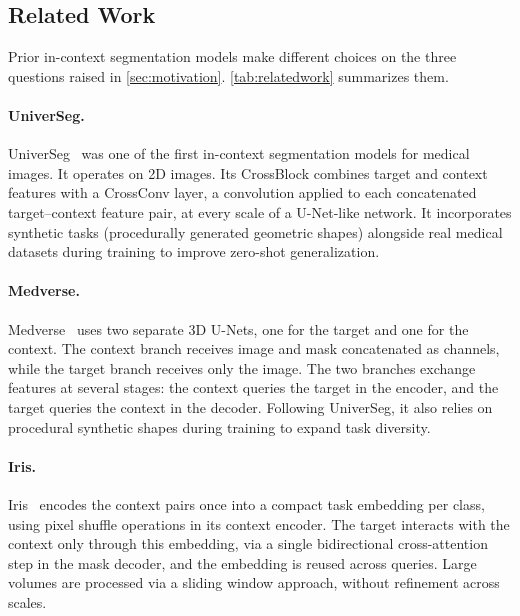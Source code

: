 \documentclass[hidelinks, a4paper, 12pt, ngerman, english]{article}  %
\begin{document}
\subsection{Related Work}\label{sec:fundamentals-relatedwork}

Prior in-context segmentation models make different choices on the three
questions raised in \autoref{sec:motivation}. \autoref{tab:relatedwork}
summarizes them.

\paragraph{UniverSeg.}
UniverSeg~\cite{butoiUniverSegUniversalMedical2023} was one of the first
in-context segmentation models for medical images. It operates on 2D images.
Its CrossBlock combines target and context features with a CrossConv layer, a
convolution applied to each concatenated target--context feature pair, at every
scale of a U-Net-like network. It incorporates 
synthetic tasks (procedurally generated geometric shapes) alongside real 
medical datasets during training to improve zero-shot generalization.



\paragraph{Medverse.}
Medverse~\cite{huMedverseUniversalModel2025a} uses two separate 3D U-Nets, one
for the target and one for the context. The context branch receives image and
mask concatenated as channels, while the target branch receives only the image.
The two branches exchange features at several stages: the context queries the
target in the encoder, and the target queries the context in the decoder.  Following UniverSeg, it also relies on procedural synthetic shapes 
during training to expand task diversity.

\paragraph{Iris.}
Iris~\cite{gaoShowSegmentUniversal2025} encodes the context pairs once into a
compact task embedding per class, using pixel shuffle operations in its context
encoder. The target interacts with the context only through this embedding, via
a single bidirectional cross-attention step in the mask decoder, and the
embedding is reused across queries. Large volumes are processed via a sliding window approach, without
refinement across scales.
\end{document}

